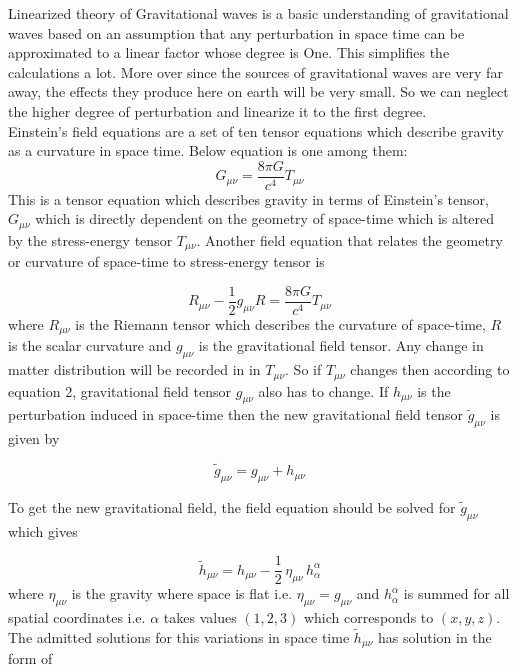 Linearized theory of Gravitational waves is a basic understanding of gravitational waves based on an assumption that any perturbation in space time can be approximated to a linear factor whose degree is One. This simplifies the calculations a lot. More over since the sources of gravitational waves are very far away, the effects they produce here on earth will be very small. So we can neglect the higher degree of perturbation and linearize it to the first degree. \\

Einstein's field equations are a set of ten tensor equations which describe gravity as a curvature in space time. Below equation is one among them: 
\begin{equation}
    G_{\mu\nu}= \frac{8 \pi  G}{c^{4}}  T_{\mu\nu}
\end{equation}
This is a tensor equation which describes gravity in terms of Einstein's tensor, $G_{\mu\nu}$ which is directly dependent on the geometry of space-time which is altered by the stress-energy tensor $T_{\mu\nu}$. Another field equation that relates the geometry or curvature of space-time to stress-energy tensor is 

\begin{equation}
    R_{\mu\nu}-\frac{1}{2}g_{\mu\nu}R=\frac{8\pi G}{c^{4}}T_{\mu\nu}
\end{equation}
where $R_{\mu\nu}$ is the Riemann tensor which describes the curvature of space-time, $R$ is the scalar curvature and $g_{\mu\nu}$ is the gravitational field tensor. Any change in matter distribution will be recorded in in $T_{\mu\nu}$. So if $T_{\mu\nu}$ changes then according to equation 2, gravitational field tensor $g_{\mu\nu}$ also has to change. If $h_{\mu\nu}$ is the perturbation induced in space-time then the new gravitational field tensor $\tilde{g}_{\mu\nu}$ is given by \cite{Kokkotas_2008}

\begin{equation}
    \tilde{g}_{\mu\nu} = g_{\mu\nu} + h_{\mu\nu}
\end{equation}

\noindent To get the new gravitational field, the field equation should be solved for $\tilde{g}_{\mu\nu}$ which gives 

\begin{equation}
    \tilde{h}_{\mu\nu} = h_{\mu\nu} - \frac{1}{2} \, \eta_{\mu\nu} \, h^{\alpha}_{\alpha}
\end{equation}
 where $\eta_{\mu\nu}$ is the gravity where space is flat i.e. $\eta_{\mu\nu} = g_{\mu\nu}$ and $h^{\alpha}_{\alpha}$ is summed for all spatial coordinates i.e. $\alpha$ takes values $(1,2,3) $ which corresponds to $(x,y,z)$. The admitted solutions for this variations in space time $\tilde{h}_{\mu\nu}$ has solution in the form of 
 
